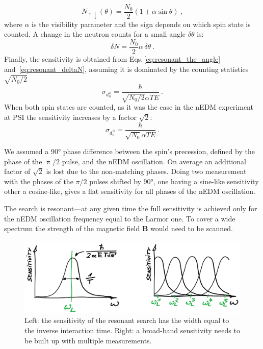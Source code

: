 \begin{equation}
  N_{\uparrow \downarrow}(\theta) = \frac{N_0}{2} \left( 1 \pm \alpha \sin \theta  \right)  \ ,
\end{equation}
where $\alpha$ is the visibility parameter and the sign depends on which spin state is counted. A change in the neutron counts for a small angle $\delta \theta$ is:
\begin{equation}
  \delta N = \frac{N_0}{2} \alpha \, \delta \theta \ .
  \label{eq:resonant_deltaN}
\end{equation}
Finally, the sensitivity is obtained from Eqs.\,\ref{eq:resonant_the_angle} and~\ref{eq:resonant_deltaN}, assuming it is dominated by the counting statistics $\sqrt{N_0/2}$
\begin{equation}
  \sigma_{d_n^{\,0}} = \frac{\hbar}{\sqrt{N_0/2} \alpha T E} \ .
\end{equation}
When both spin states are counted, as it was the case in the nEDM experiment at PSI the sensitivity increases by a factor $\sqrt{2}$:
\begin{equation}
  \sigma_{d_n^{\,0}} = \frac{\hbar}{\sqrt{N_0} \alpha T E} \ .
\end{equation}

We assumed a \ang{90} phase difference between the spin's precession, defined by the phase of the $\uppi/2$ pulse, and the nEDM oscillation. On average an additional factor of $\sqrt{2}$ is lost due to the non-matching phases.
Doing two measurement with the phases of the $\pi/2$ pulses shifted by \ang{90}, one having a sine-like sensitivity other a cosine-like, gives a flat sensitivity for all phases of the nEDM oscillation.

The search is resonant---at any given time the full sensitivity is achieved only for the nEDM oscillation frequency equal to the Larmor one. To cover a wide spectrum the strength of the magnetic field $\mathbf{B}$ would need to be scanned.

\begin{figure}
  \centering
  \includegraphics[width=\linewidth]{gfx/axions/resonant_sensitivity.png}
  \caption{Left: the sensitivity of the resonant search has the width equal to the inverse interaction time. Right: a broad-band sensitivity needs to be built up with multiple measurements.}\label{fig:axions_resonant_sensitivity}
\end{figure}

